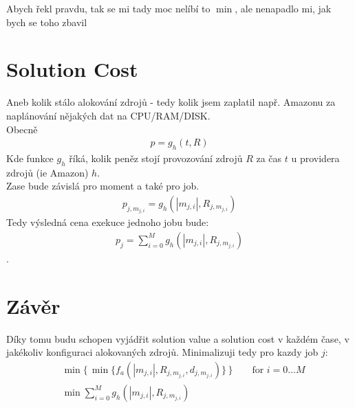 \documentclass[11pt]{article}
\begin{document}
    Abych řekl pravdu, tak se mi tady moc nelíbí to $\min$, ale nenapadlo mi, jak bych se toho zbavil

    \section{Solution Cost}\label{sec:solution-cost}
    Aneb kolik stálo alokování zdrojů - tedy kolik jsem zaplatil např. Amazonu za naplánování nějakých dat na CPU/RAM/DISK.\\
    Obecně
    \begin{align*}
        p = g_{h} (t, R)
    \end{align*}
    Kde funkce $g_h$ říká, kolik peněz stojí provozování zdrojů $R$ za čas $t$ u providera zdrojů (ie Amazon) $h$.\\
    Zase bude závislá pro moment a také pro job.
    \begin{align*}
        p_{j, m_{j, i}} = g_{h} (|m_{j,i}|, R_{j, m_{j,i}})
    \end{align*}
    Tedy výsledná cena exekuce jednoho jobu bude:
    \begin{align*}
        p_{j} = \sum_{i = 0}^{M} g_{h} ( |m_{j,i}|, R_{j, m_{j,i}} )
    \end{align*}.

    \section{Závěr}\label{sec:zaver}
    Díky tomu budu schopen vyjádřit solution value a solution cost v každém čase, v jakékoliv konfiguraci alokovaných zdrojů.
    Minimalizuji tedy pro kazdy job $j$:
    \begin{align*}
        &\min \{\, \min \{ f_{a}(|m_{j, i}|, R_{j, m_{j, i}}, d_{j, m_{j, i}}) \}\, \} \qquad \text{for } i = 0\dots M \\
        &\min \sum_{i = 0}^{M} g_{h} ( |m_{j,i}|, R_{j, m_{j,i}} )
    \end{align*}
\end{document}
